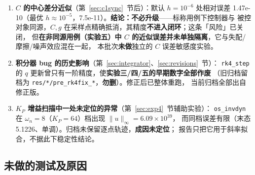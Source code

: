 \documentclass[11pt,a4paper]{ctexart}
\begin{document}
\begin{enumerate}[leftmargin=2em,itemsep=4pt]
  \textbf{1.019--1.042}（非 1）$\Rightarrow$ 任务空间误差范数口径\textbf{必须显式声明}
  （本报告用 $\ell=0.5$ m）。
\item \textbf{$C$ 的中心差分近似}（第~\ref{sec:c1sync}~节后）：默认 $h=10^{-6}$ 处相对误差
  1.47e-10（最优 $h\approx10^{-5}$，7.5e-11）。\textbf{结论：不必升级}——标称用例下控制器与
  被控对象同源，$C,g$ 在采样点精确抵消，其精度\textbf{不进入闭环}；这条「风险」已关闭，
  但\textbf{在非同源用例（实验五）中 $C$ 的近似误差并未单独隔离}，它与失配/摩擦/噪声效应混在一起，
  本批次\textbf{未做}独立的 $C$ 误差敏感度实验。
\item \textbf{积分器 bug 的历史影响}（第~\ref{sec:integrator}、\ref{sec:revisions}~节）：
  \texttt{rk4\_step} 的 $q$ 更新曾只有一阶精度，使\textbf{实验三/四/五的早期数字全部作废}
  （旧归档留档为 \texttt{res/*/pre\_rk4fix\_*}，\textbf{勿删}）。修正后已整体重跑，
  当前归档全部出自修正版。
\item \textbf{$K_P$ 增益扫描中一处未定位的异常}（第~\ref{sec:exp4}~节辅助实验）：
  \texttt{os\_invdyn} 在 $\omega_n=8$（$K_P=64$）档出现 $\|u\|_\infty=6.09\times10^{39}$，
  而同档误差有限（末态 5.1226、单调）。归档未保留逐点轨迹，\textbf{成因未定位}；
  报告只把它用于斜率拟合，不据此下稳定性结论。
\end{enumerate}

\subsection{未做的测试及原因}\label{sec:notdone}
\end{document}
